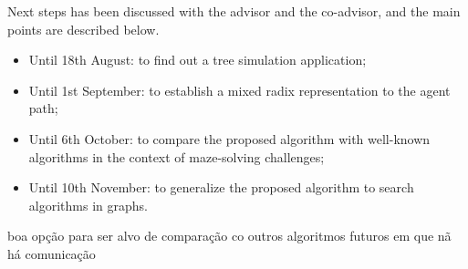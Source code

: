 Next steps has been discussed with the advisor and the co-advisor, and the main points are described below.

\begin{itemize}
\item Until 18th August: to find out a tree simulation application;
\item Until 1st September: to establish a mixed radix representation to the agent path;
\item Until 6th October: to compare the proposed algorithm with well-known algorithms in the context of maze-solving challenges;
\item Until 10th November: to generalize the proposed algorithm to search algorithms in graphs.
\end{itemize}

boa opção para ser alvo de comparação co outros algoritmos futuros em que nã há comunicação